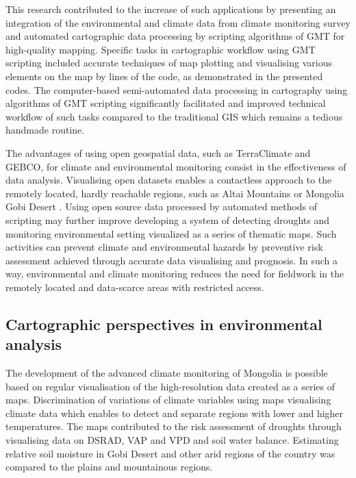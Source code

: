 \documentclass[geosciences,article,submit,pdftex,moreauthors]{Definitions/mdpi}
\begin{document}
This research contributed to the increase of such applications by presenting an integration of the environmental and climate data from climate monitoring survey and automated cartographic data processing by scripting algorithms of GMT for high-quality mapping. Specific tasks in cartographic workflow using GMT scripting included accurate techniques of map plotting and visualising various elements on the map by lines of the code, as demonstrated in the presented codes. The computer-based semi-automated data processing in cartography using algorithms of GMT scripting significantly facilitated and improved technical workflow of such tasks compared to the traditional GIS which remains a tedious handmade routine. 

The advantages of using open geospatial data, such as TerraClimate and GEBCO, for climate and environmental monitoring consist in the effectiveness of data analysis. Visualising open datasets enables a contactless approach to the remotely located, hardly reachable regions, such as Altai Mountains or Mongolia Gobi Desert \cite{HEINER202078}. Using open source data processed by automated methods of scripting may further improve developing a system of detecting droughts and monitoring environmental setting visualized as a series of thematic maps. Such activities can prevent climate and environmental hazards by preventive risk assessment achieved through accurate data visualising and prognosis. In such a way, environmental and climate monitoring reduces the need for fieldwork in the remotely located and data-scarce areas with restricted access.

\subsection{Cartographic perspectives in environmental analysis}
The development of the advanced climate monitoring of Mongolia is possible based on regular visualisation of the high-resolution data created as a series of maps. Discrimination of variations of climate variables using maps visualising climate data which enables to detect and separate regions with lower and higher temperatures. The maps contributed to the risk assessment of droughts through visualising data on DSRAD, VAP and VPD and soil water balance. Estimating relative soil moisture in Gobi Desert and other arid regions of the country was compared to the plains and mountainous regions. 
\end{document}
